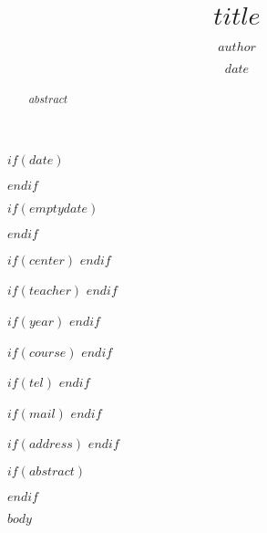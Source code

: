 \documentclass[$if(classoptions)$$classoptions$$endif$]{ifirak}
\begin{document}
\title{$title$}
\author{$author$}

$if(date)$
\date{$date$}
$endif$

$if(emptydate)$
\date{}
$endif$

$if(center)$
$endif$

$if(teacher)$
$endif$

$if(year)$
$endif$

$if(course)$
$endif$

$if(tel)$
$endif$

$if(mail)$
$endif$

$if(address)$
$endif$

\maketitle
$if(abstract)$
\begin{abstract}
$abstract$
\end{abstract}
$endif$


$body$
\end{document}
